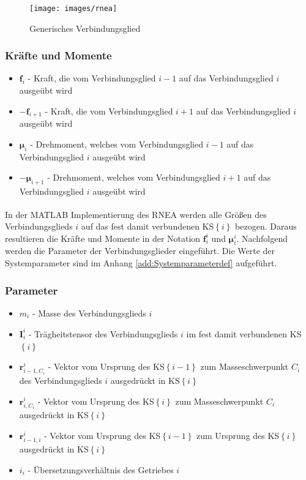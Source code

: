 \begin{figure}[tbph]
	\centering
	\texttt{[image: images/rnea]}
	\caption{Generisches Verbindungsglied \cite[S.~283]{Grimble.2009}}
	\label{fig:rnea}
\end{figure} 

\subsubsection*{Kräfte und Momente}
\begin{itemize}
	\item $ \boldsymbol{f}_i $ - Kraft, die vom Verbindungsglied $ i-1 $ auf das Verbindungsglied $ i $ ausgeübt wird
	\item $ -\boldsymbol{f}_{i+1} $ - Kraft, die vom Verbindungsglied $ i+1 $ auf das Verbindungsglied $ i $ ausgeübt wird
	\item $ \boldsymbol{\mu}_i $ - Drehmoment, welches vom Verbindungsglied $ i-1 $ auf das Verbindungsglied $ i $ ausgeübt wird
	\item $ -\boldsymbol{\mu}_{i+1} $ - Drehmoment, welches vom Verbindungsglied $ i+1 $ auf das Verbindungsglied $ i $ ausgeübt wird
\end{itemize}
%
In der MATLAB\textsuperscript{\textregistered} Implementierung des RNEA werden alle Größen  des Verbindungsglieds $i$ auf das  fest damit verbundenen KS$\left\{i\right\}$ bezogen. Daraus resultieren die Kräfte und Momente in der Notation $\boldsymbol{f}_{i}^{i} $ und $ \boldsymbol{\mu}_i^{i} $. Nachfolgend werden die Parameter der Verbindungsglieder eingeführt. Die Werte der Systemparameter sind im Anhang \ref{add:Systemparameterdef} aufgeführt.
%
\subsubsection*{Parameter}
\begin{itemize}
	\item $ m_i $ - Masse des Verbindungsglieds $i$
	\item $ \bm{I}^{i}_{i} $ - Trägheitstensor des Verbindungsglieds $i$ im fest damit verbundenen KS$\left\{i\right\}$ 
	\item $ \boldsymbol{r}^{i}_{i-1,C_i} $ - Vektor vom Ursprung des KS$\left\{i-1\right\}$ zum Masseschwerpunkt $ C_i $ des Verbindungsglieds $i$ ausgedrückt in KS$\left\{i\right\}$ 
	\item $ \boldsymbol{r}^{i}_{i,C_i} $ - Vektor vom Ursprung des KS$\left\{i\right\}$ zum Masseschwerpunkt $ C_i $ ausgedrückt in KS$\left\{i\right\}$ 
	\item $ \boldsymbol{r}^{i}_{i-1,i} $ - Vektor vom Ursprung des KS$\left\{i-1\right\}$ zum Ursprung des  KS$\left\{i\right\}$ ausgedrückt in KS$\left\{i\right\}$ 
	\item $ i_i$ - Übersetzungsverhältnis des Getriebes $i$
\end{itemize}
%
